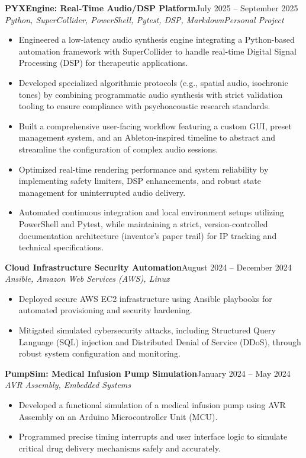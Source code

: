 \documentclass[letterpaper,11pt]{article}
\newcommand{\resumeEntry}[4]{
    \vspace{2pt}
    \noindent\textbf{#1}\hfill{#2}
    \newline
    \noindent\textit{#3}\hfill\textit{#4}
    \vspace{-3pt}
}
\newcommand{\resumeItemListStart}{\begin{itemize}[label=$\bullet$, leftmargin=1.1em, itemsep=0pt, parsep=0pt, topsep=2pt]}
\newcommand{\resumeItemListEnd}{\end{itemize}}
\begin{document}
    \resumeEntry
        {PYXEngine: Real-Time Audio/DSP Platform}
        {July 2025 – September 2025}
        {Python, SuperCollider, PowerShell, Pytest, DSP, Markdown}
        {Personal Project}
    \resumeItemListStart
        \item Engineered a low-latency audio synthesis engine integrating a Python-based automation framework with SuperCollider to handle real-time Digital Signal Processing (DSP) for therapeutic applications.
        \item Developed specialized algorithmic protocols (e.g., spatial audio, isochronic tones) by combining programmatic audio synthesis with strict validation tooling to ensure compliance with psychoacoustic research standards.
        \item Built a comprehensive user-facing workflow featuring a custom GUI, preset management system, and an Ableton-inspired timeline to abstract and streamline the configuration of complex audio sessions.
        \item Optimized real-time rendering performance and system reliability by implementing safety limiters, DSP enhancements, and robust state management for uninterrupted audio delivery.
        \item Automated continuous integration and local environment setups utilizing PowerShell and Pytest, while maintaining a strict, version-controlled documentation architecture (inventor’s paper trail) for IP tracking and technical specifications.
        
    \resumeItemListEnd
    \resumeEntry
        {Cloud Infrastructure Security Automation}
        {August 2024 – December 2024}
        {Ansible, Amazon Web Services (AWS), Linux} {}
     \resumeItemListStart
        \item Deployed secure AWS EC2 infrastructure using Ansible playbooks for automated provisioning and security hardening.
        \item Mitigated simulated cybersecurity attacks, including Structured Query Language (SQL) injection and Distributed Denial of Service (DDoS), through robust system configuration and monitoring.
     \resumeItemListEnd
    
    \resumeEntry
        {PumpSim: Medical Infusion Pump Simulation}
        {January 2024 – May 2024}
        {AVR Assembly, Embedded Systems} {}
    \resumeItemListStart
        \item Developed a functional simulation of a medical infusion pump using AVR Assembly on an Arduino Microcontroller Unit (MCU).
        \item Programmed precise timing interrupts and user interface logic to simulate critical drug delivery mechanisms safely and accurately.
    \resumeItemListEnd
\end{document}
